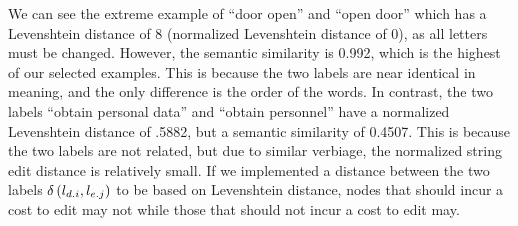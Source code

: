 We can see the extreme example of ``door open'' and ``open door'' which has a Levenshtein distance of 8 (normalized Levenshtein distance of 0), as all letters must be changed. However, the semantic similarity is 0.992, which is the highest of our selected examples. This is because the two labels are near identical in meaning, and the only difference is the order of the words. In contrast, the two labels ``obtain personal data'' and ``obtain personnel'' have a normalized Levenshtein distance of .5882, but a semantic similarity of 0.4507. This is because the two labels are not related, but due to similar verbiage, the normalized string edit distance is relatively small. If we implemented a distance between the two labels  $\delta\left(l_{{d}.{i}}, l_{{e}.{j}}\right)$ to be based on Levenshtein distance, nodes that should incur a cost to edit may not while those that should not incur a cost to edit may.

